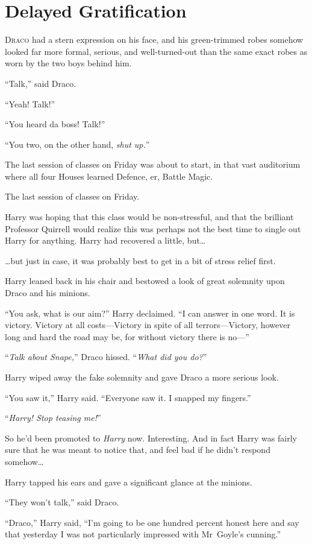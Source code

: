 \chapter{Delayed Gratification}

\lettrine{D}{raco} had a stern expression on his face, and his green-trimmed robes somehow looked far more formal, serious, and well-turned-out than the same exact robes as worn by the two boys behind him.

“Talk,” said Draco.

“Yeah! Talk!”

“You heard da boss! Talk!”

“You two, on the other hand, \emph{shut up.}”

The last session of classes on Friday was about to start, in that vast auditorium where all four Houses learned Defence, er, Battle Magic.

The last session of classes on Friday.

Harry was hoping that this class would be non-stressful, and that the brilliant Professor Quirrell would realize this was perhaps not the best time to single out Harry for anything. Harry had recovered a little, but…

…but just in case, it was probably best to get in a bit of stress relief first.

Harry leaned back in his chair and bestowed a look of great solemnity upon Draco and his minions.

“You ask, what is our aim?” Harry declaimed. “I can answer in one word. It is victory. Victory at all costs—Victory in spite of all terrors—Victory, however long and hard the road may be, for without victory there is no—”

“\emph{Talk about Snape,}” Draco hissed. “\emph{What did you do?}”

Harry wiped away the fake solemnity and gave Draco a more serious look.

“You saw it,” Harry said. “Everyone saw it. I snapped my fingers.”

“\emph{Harry! Stop teasing me!}”

So he’d been promoted to \emph{Harry} now. Interesting. And in fact Harry was fairly sure that he was meant to notice that, and feel bad if he didn’t respond somehow…

Harry tapped his ears and gave a significant glance at the minions.

“They won’t talk,” said Draco.

“Draco,” Harry said, “I’m going to be one hundred percent honest here and say that yesterday I was not particularly impressed with Mr~Goyle’s cunning.”


